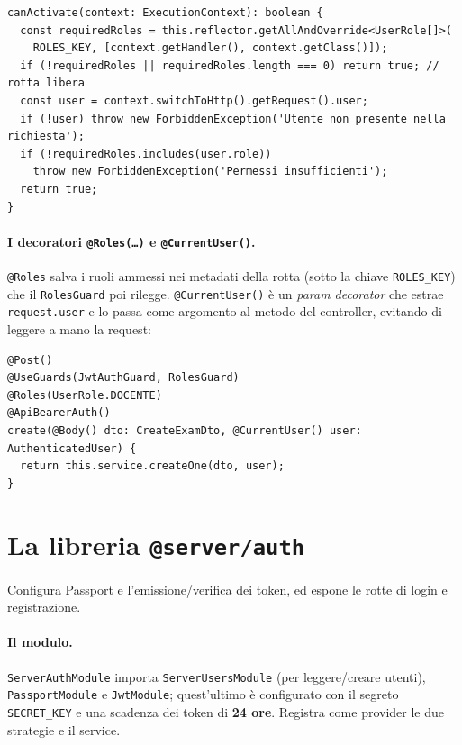 \documentclass[11pt,a4paper,oneside]{report}
\newcommand{\code}[1]{\texttt{\small #1}}
\newcommand{\file}[1]{\texttt{\small #1}}
\begin{document}
\begin{lstlisting}[caption={\file{roles.guard.ts} (estratto).}]
canActivate(context: ExecutionContext): boolean {
  const requiredRoles = this.reflector.getAllAndOverride<UserRole[]>(
    ROLES_KEY, [context.getHandler(), context.getClass()]);
  if (!requiredRoles || requiredRoles.length === 0) return true; // rotta libera
  const user = context.switchToHttp().getRequest().user;
  if (!user) throw new ForbiddenException('Utente non presente nella richiesta');
  if (!requiredRoles.includes(user.role))
    throw new ForbiddenException('Permessi insufficienti');
  return true;
}
\end{lstlisting}

\paragraph{I decoratori \code{@Roles(\ldots)} e \code{@CurrentUser()}.}
\code{@Roles} salva i ruoli ammessi nei metadati della rotta (sotto la chiave
\code{ROLES\_KEY}) che il \code{RolesGuard} poi rilegge. \code{@CurrentUser()} è
un \emph{param decorator} che estrae \code{request.user} e lo passa come
argomento al metodo del controller, evitando di leggere a mano la request:

\begin{lstlisting}[caption={Uso combinato di guard e decoratori su una rotta.}]
@Post()
@UseGuards(JwtAuthGuard, RolesGuard)
@Roles(UserRole.DOCENTE)
@ApiBearerAuth()
create(@Body() dto: CreateExamDto, @CurrentUser() user: AuthenticatedUser) {
  return this.service.createOne(dto, user);
}
\end{lstlisting}

\section{La libreria \texttt{@server/auth}}
Configura Passport e l'emissione/verifica dei token, ed espone le rotte di
login e registrazione.

\paragraph{Il modulo.} \code{ServerAuthModule} importa \code{ServerUsersModule}
(per leggere/creare utenti), \code{PassportModule} e \code{JwtModule}; quest'ultimo
è configurato con il segreto \code{SECRET\_KEY} e una scadenza dei token di
\textbf{24 ore}. Registra come provider le due strategie e il service.
\end{document}
